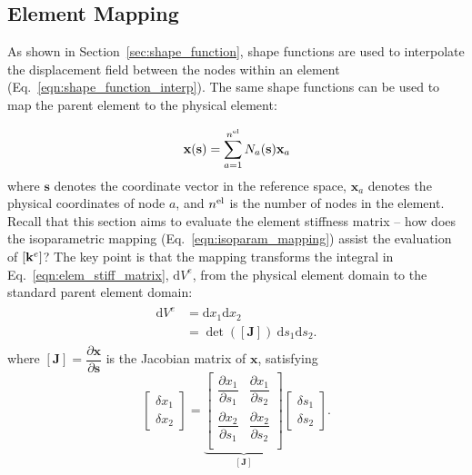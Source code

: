 \documentclass[12pt, a4paper]{article}
\numberwithin{equation}{section}
\begin{document}
\newpage
\subsection{Element Mapping}
\label{sec:element_mapping}

As shown in Section~\ref{sec:shape_function}, shape functions are used to interpolate the displacement field between the nodes within an element (Eq.~\eqref{eqn:shape_function_interp}). The same shape functions can be used to map the parent element to the physical element:

\begin{equation}
\label{eqn:isoparam_mapping}
    \mathbf{x}(\mathbf{s}) = \sum_{a=1}^{n^{\rm el}} N_a(\mathbf{s}) \mathbf{x}_a
\end{equation}
where $\mathbf{s}$ denotes the coordinate vector in the reference space, $\mathbf{x}_a$ denotes the physical coordinates of node $a$, and $n^{\rm el}$ is the number of nodes in the element.\\

Recall that this section aims to evaluate the element stiffness matrix -- how does the isoparametric mapping (Eq.~\eqref{eqn:isoparam_mapping}) assist the evaluation of $[\mathbf{k}^e]$? The key point is that the mapping transforms the integral in Eq.~\eqref{eqn:elem_stiff_matrix}, $\mathrm{d} V^e$, from the physical element domain to the standard parent element domain:
\begin{align}
    \begin{split}
        \mathrm{d} V^e 
        & = \mathrm{d}x_1 \mathrm{d} x_2 \\
        & = \det([\mathbf{J}]) \ \mathrm{d} s_1 \mathrm{d} s_2.
    \end{split}
\end{align}
where $[\mathbf{J}] = \dfrac{\partial \mathbf{x}}{\partial \mathbf{s}}$ is the Jacobian matrix of $\mathbf{x}$, satisfying 
\begin{equation}
    \begin{bmatrix}
        \delta x_1 \\
        \delta x_2 
    \end{bmatrix}
    = 
    \underbrace{\begin{bmatrix}
    \dfrac{\partial x_1}{\partial s_1} &
    \dfrac{\partial x_1}{\partial s_2} \\[2.5ex]
    \dfrac{\partial x_2}{\partial s_1} &
    \dfrac{\partial x_2}{\partial s_2} \\
    \end{bmatrix}}_{[\mathbf{J}]}
    \begin{bmatrix}
        \delta s_1 \\
        \delta s_2 
    \end{bmatrix}.
\end{equation}
\end{document}
